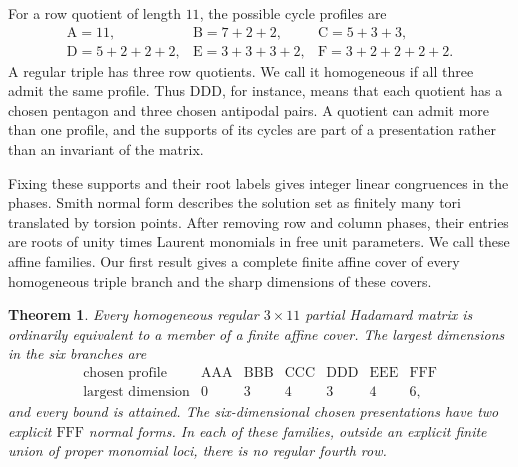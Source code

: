 \documentclass[11pt,a4paper]{article}
\theoremstyle{plain}
\theoremstyle{definition}
\theoremstyle{plain}
\newtheorem{introtheorem}{Theorem}
\begin{document}
For a row quotient of length $11$, the possible cycle profiles are
\[
\begin{array}{lll}
\mathrm{A}=11,&\mathrm{B}=7+2+2,&\mathrm{C}=5+3+3,\\
\mathrm{D}=5+2+2+2,&\mathrm{E}=3+3+3+2,&\mathrm{F}=3+2+2+2+2.
\end{array}
\]
A regular triple has three row quotients. We call it homogeneous if all three admit the same profile. Thus $\mathrm{DDD}$, for instance, means that each quotient has a chosen pentagon and three chosen antipodal pairs. A quotient can admit more than one profile, and the supports of its cycles are part of a presentation rather than an invariant of the matrix.

Fixing these supports and their root labels gives integer linear congruences in the phases. Smith normal form describes the solution set as finitely many tori translated by torsion points. After removing row and column phases, their entries are roots of unity times Laurent monomials in free unit parameters. We call these affine families. Our first result gives a complete finite affine cover of every homogeneous triple branch and the sharp dimensions of these covers.

\par\addvspace{\medskipamount}\noindent
\begin{minipage}{\linewidth}
\begin{introtheorem}\label{intro:homogeneous}
Every homogeneous regular $3\times11$ partial Hadamard matrix is ordinarily equivalent to a member of a finite affine cover. The largest dimensions in the six branches are
\[
\begin{array}{c|rrrrrr}
\text{chosen profile}&\mathrm{AAA}&\mathrm{BBB}&\mathrm{CCC}&\mathrm{DDD}&\mathrm{EEE}&\mathrm{FFF}\\\hline
\text{largest dimension}&0&3&4&3&4&6,
\end{array}
\]
and every bound is attained. The six-dimensional chosen presentations have two explicit $\mathrm{FFF}$ normal forms. In each of these families, outside an explicit finite union of proper monomial loci, there is no regular fourth row.
\end{introtheorem}
\end{minipage}
\par\addvspace{\medskipamount}
\end{document}
